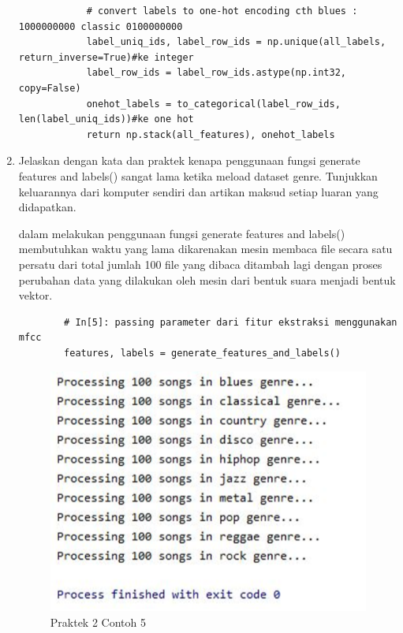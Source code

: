 \begin{enumerate}
\begin{verbatim}
		    # convert labels to one-hot encoding cth blues : 1000000000 classic 0100000000
		    label_uniq_ids, label_row_ids = np.unique(all_labels, return_inverse=True)#ke integer
		    label_row_ids = label_row_ids.astype(np.int32, copy=False)
		    onehot_labels = to_categorical(label_row_ids, len(label_uniq_ids))#ke one hot
		    return np.stack(all_features), onehot_labels
		\end{verbatim}

		\item Jelaskan dengan kata dan praktek kenapa penggunaan fungsi generate features and labels() sangat lama ketika meload dataset genre. Tunjukkan keluarannya dari komputer sendiri dan artikan maksud setiap luaran yang didapatkan.
		\par dalam melakukan penggunaan fungsi generate features and labels() membutuhkan waktu yang lama dikarenakan mesin membaca file secara satu persatu dari total jumlah 100 file yang dibaca ditambah lagi dengan proses perubahan data yang dilakukan oleh mesin dari bentuk suara menjadi bentuk vektor.
		\begin{verbatim}
		# In[5]: passing parameter dari fitur ekstraksi menggunakan mfcc
		features, labels = generate_features_and_labels()
		\end{verbatim}
    	   	\begin{figure}[H]
				\centering
				\includegraphics[scale=0.4]{figures/1174057/chapter6/p5.PNG}
				\caption{Praktek 2 Contoh 5}
				\label{Praktek 2 Contoh 5}
			\end{figure}


\end{enumerate}
